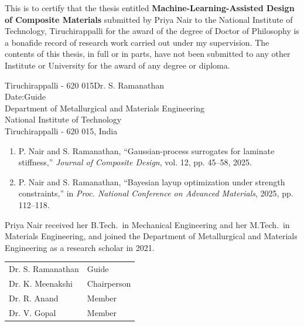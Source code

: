 \documentclass[12pt,oneside]{report}
\begin{document}

\setcounter{page}{2}
This is to certify that the thesis entitled \textbf{Machine-Learning-Assisted Design of Composite Materials} submitted by
Priya Nair to the National Institute of Technology, Tiruchirappalli for the award of
the degree of Doctor of Philosophy is a bonafide record of research work carried out under my
supervision. The contents of this thesis, in full or in parts, have not been submitted to any
other Institute or University for the award of any degree or diploma.\par
\vspace{0.8in}
\noindent Tiruchirappalli - 620 015\hfill Dr. S. Ramanathan\\
Date:\hfill Guide\\
\hspace*{\fill}Department of Metallurgical and Materials Engineering\\
\hspace*{\fill}National Institute of Technology\\
\hspace*{\fill}Tiruchirappalli - 620 015, India
\clearpage
{}
\begin{doublespace}

\end{doublespace}
\clearpage
{}

\clearpage
\tableofcontents
\listoftables
\listoffigures
\clearpage
{}






\appendix





\begin{enumerate}
\item P. Nair and S. Ramanathan, ``Gaussian-process surrogates for laminate stiffness,'' \textit{Journal of Composite Design}, vol. 12, pp. 45--58, 2025.
\item P. Nair and S. Ramanathan, ``Bayesian layup optimization under strength constraints,'' in \textit{Proc. National Conference on Advanced Materials}, 2025, pp. 112--118.
\end{enumerate}
\clearpage
{}
Priya Nair received her B.Tech.\ in Mechanical Engineering and her M.Tech.\ in Materials
Engineering, and joined the Department of Metallurgical and Materials Engineering as a research
scholar in 2021.
\clearpage
{}
\noindent\begin{tabular}{@{}ll@{}}
Dr. S. Ramanathan & Guide\\
Dr. K. Meenakshi & Chairperson\\
Dr. R. Anand & Member\\
Dr. V. Gopal & Member\\
\end{tabular}
\end{document}
